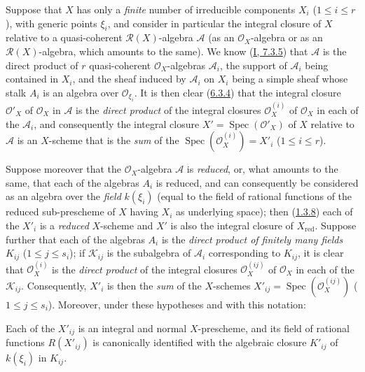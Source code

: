 \begin{env}[6.3.6]
\label{II.6.3.6}
Suppose that $X$ has only a \emph{finite} number of irreducible components
$X_i$ ($1\leq i\leq r$), with generic points $\xi_i$, and consider in
particular the integral closure of $X$ relative to a quasi-coherent
$\mathcal{R}(X)$-algebra $\mathcal{A}$ (as an $\mathcal{O}_X$-algebra or as
an $\mathcal{R}(X)$-algebra, which amounts to the same). We know
(\hyperref[I.7.3.5]{I, 7.3.5}) that $\mathcal{A}$ is the direct product
of $r$ quasi-coherent $\mathcal{O}_X$-algebras $\mathcal{A}_i$, the support
of $\mathcal{A}_i$ being contained in $X_i$, and the sheaf induced by
$\mathcal{A}_i$ on $X_i$ being a simple sheaf whose stalk $A_i$ is an
algebra over $\mathcal{O}_{\xi_i}$. It is then clear
(\hyperref[II.6.3.4]{6.3.4}) that the integral closure $\mathcal{O}'_X$ of
$\mathcal{O}_X$ in $\mathcal{A}$ is the \emph{direct product} of the integral
closures $\mathcal{O}^{(i)}_X$ of $\mathcal{O}_X$ in each of the
$\mathcal{A}_i$, and consequently the integral closure
$X'=\operatorname{Spec}(\mathcal{O}'_X)$ of $X$ relative to $\mathcal{A}$ is
an $X$-scheme that is the \emph{sum} of the
$\operatorname{Spec}(\mathcal{O}^{(i)}_X)=X'_i$ ($1\leq i\leq r$).

Suppose moreover that the $\mathcal{O}_X$-algebra $\mathcal{A}$ is
\emph{reduced}, or, what amounts to the same, that each of the algebras $A_i$
is reduced, and can consequently be considered as an algebra over the
\emph{field} $k(\xi_i)$ (equal to the field of rational functions of the
reduced sub-prescheme of $X$ having $X_i$ as underlying space); then
(\hyperref[II.1.3.8]{1.3.8}) each of the $X'_i$ is a \emph{reduced}
$X$-scheme and $X'$ is also the integral closure of $X_{\mathrm{red}}$.
Suppose further that each of the algebras $A_i$ is the \emph{direct product
of finitely many fields} $K_{ij}$ ($1\leq j\leq s_i$); if
$\mathcal{K}_{ij}$ is the subalgebra of $\mathcal{A}_i$ corresponding to
$K_{ij}$, it is clear that $\mathcal{O}^{(i)}_X$ is the \emph{direct product}
of the integral closures $\mathcal{O}^{(ij)}_X$ of $\mathcal{O}_X$ in each of
the $\mathcal{K}_{ij}$. Consequently, $X'_i$ is then the \emph{sum} of the
$X$-schemes $X'_{ij}=\operatorname{Spec}(\mathcal{O}^{(ij)}_X)$
($1\leq j\leq s_i$). Moreover, under these hypotheses and with this
notation:
\end{env}


\begin{proposition}[6.3.7]
\label{II.6.3.7}
Each of the $X'_{ij}$ is an integral and normal $X$-prescheme, and its field
of rational functions $R(X'_{ij})$ is canonically identified with the
algebraic closure $K'_{ij}$ of $k(\xi_i)$ in $K_{ij}$.
\end{proposition}

